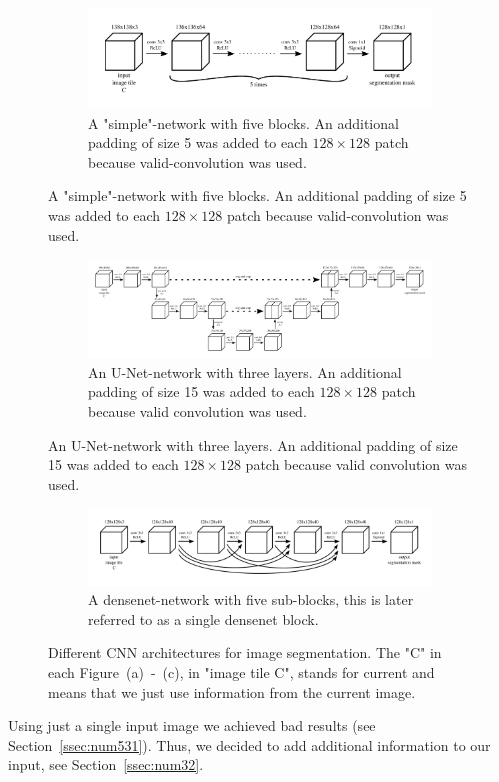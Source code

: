\begin{figure}[H]
	\centering
	\begin{subfigure}{.70\textwidth}
		\centering
		\includegraphics[width=\linewidth]{models_single/early.png}
		\caption[figure]{A "simple"-network with five blocks. An additional padding of size 5 was added to each $128\times128$ patch because valid-convolution was used.}
		\label{fig:single_simple}
	\end{subfigure}
\end{figure}
\begin{figure}[H]
  \ContinuedFloat
  \centering
		\begin{subfigure}{.95\textwidth}
		\centering
		\includegraphics[width=\linewidth]{models_single/unet.png}
		\caption[figure]{An U-Net-network with three layers. An additional padding of size 15 was added to each $128\times128$ patch because valid convolution was used.}
		\label{fig:single_unet}
	\end{subfigure}
\end{figure}
\begin{figure}[H]
  \ContinuedFloat
  \centering
		\begin{subfigure}{.95\textwidth}
		\centering
		\includegraphics[width=\linewidth]{models_single/densenet.png}
		\caption[figure]{A densenet-network with five sub-blocks, this is later referred to as a single densenet block.}
		\label{fig:single_densenet}
	\end{subfigure}
	
	
	\caption[figure]{Different CNN architectures for image segmentation. The "C" in each Figure~(a)~-~(c), in "image tile C", stands for current and means that we just use information from the current image.}
	\label{fig:single_architecutes}
\end{figure}
Using just a single input image we achieved bad results (see Section~\ref{ssec:num531}). Thus, we decided to add additional information to our input, see Section~\ref{ssec:num32}.

